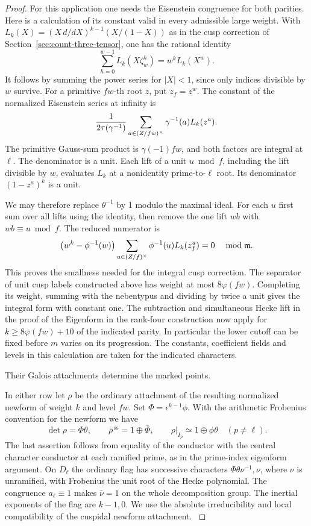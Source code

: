 \begin{proof}
For this application one needs the Eisenstein congruence for both
parities. Here is a calculation of its constant valid in every
admissible large weight. With \(L_k(X)=(X\,d/dX)^{k-1}(X/(1-X))\)
as in the cusp correction of Section~\ref{sec:count-three-tensor},
one has the rational identity
\[
    \sum_{h=0}^{w-1}L_k(X\zeta_w^h)=w^kL_k(X^w).
\]
It follows by summing the power series for \(|X|<1\), since only
indices divisible by \(w\) survive. For a primitive \(fw\)-th
root \(z\), put \(z_f=z^w\). The constant of the normalized
Eisenstein series at infinity is
\[
  \frac{1}{2\tau(\gamma^{-1})}
     \sum_{a\in(Z/fw)^\times}\gamma^{-1}(a)L_k(z^a).
\]
The primitive Gauss-sum product is \(\gamma(-1)fw\), and both
factors are integral at \(\ell\). The denominator is a unit.
Each lift of a unit \(u\bmod f\), including the lift divisible by
\(w\), evaluates \(L_k\) at a nonidentity prime-to-\(\ell\) root.
Its denominator \((1-z^a)^k\) is a unit.

We may therefore replace
\(\theta^{-1}\) by 1 modulo the maximal ideal. For each \(u\)
first sum over all lifts using the identity, then remove the
one lift \(wb\) with \(wb\equiv u\bmod f\). The reduced numerator is
\[
    \bigl(w^k-\phi^{-1}(w)\bigr)
       \sum_{u\in(Z/f)^\times}\phi^{-1}(u)L_k(z_f^u)=0
       \quad\bmod\mathfrak m .
\]
This proves the smallness needed for the integral cusp correction.
The separator of unit cusp labels constructed above has weight at
most \(8\varphi(fw)\). Completing its weight, summing with the
nebentypus and dividing by twice a unit gives the integral form
with constant one. The subtraction and simultaneous Hecke lift in
the proof of the Eigenform in the rank-four construction now apply for
\(k\ge 8\varphi(fw)+10\) of the indicated parity. In particular
the lower cutoff can be fixed before \(m\) varies on its progression.
The constants, coefficient fields and levels in this calculation
are taken for the indicated characters.

Their Galois attachments determine the marked points.

In either row let \(\rho\) be the ordinary attachment of the
resulting normalized newform of weight \(k\) and level \(fw\).
Set \(\Phi=\epsilon^{k-1}\phi\). With the arithmetic Frobenius
convention for the newform we have
\[
  \det\rho=\Phi\theta,\qquad
  \bar\rho^{\,\mathrm{ss}}=1\oplus\bar\Phi,\qquad
  \rho|_{I_p}\simeq1\oplus\phi\theta\quad(p\ne\ell).
\]
The last assertion follows from equality of the conductor with the
central character conductor at each ramified prime, as in the
prime-index eigenform argument. On \(D_\ell\) the ordinary flag has
successive characters \(\Phi\theta\nu^{-1},\nu\), where \(\nu\)
is unramified, with Frobenius the unit root of the Hecke polynomial.
The congruence \(a_\ell\equiv1\) makes \(\bar\nu=1\) on the
whole decomposition group. The inertial exponents of the flag
are \(k-1,0\). We use the absolute irreducibility and local
compatibility of the cuspidal newform attachment.
\cite{deligne-galois,carayol-local,hida-ordinary-galois}

\end{proof}

